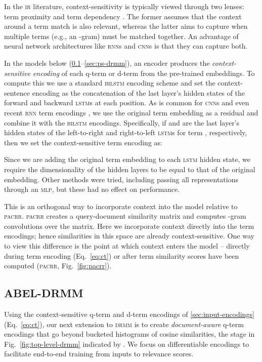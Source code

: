 \documentclass[11pt,a4paper]{article}
\newcommand{\mlp}{\textsc{mlp}\xspace}
\newcommand{\lstm}{\textsc{lstm}\xspace}
\newcommand{\bilstm}{\textsc{bilstm}\xspace}
\newcommand{\rnn}{\textsc{rnn}\xspace}
\newcommand{\cnn}{\textsc{cnn}\xspace}
\newcommand{\ir}{\textsc{ir}\xspace}
\newcommand{\drmm}{\textsc{drmm}\xspace}
\newcommand{\pacrr}{\textsc{pacrr}\xspace}
\begin{document}
In the \ir literature, context-sensitivity is typically viewed through two lenses: term proximity \cite{buttcher2006term} and term dependency \cite{metzler2005markov}. The former assumes that
the context around a term match is also relevant, whereas the latter aims to capture when multiple terms (e.g., an -gram) must be 
matched together. An advantage of neural network architectures like \rnn{s} and \cnn{s} is that they can capture both.

In the models below (\ref{sec:had-drmm}--\ref{sec:ps-drmm}), an encoder produces the \emph{context-sensitive encoding} of each q-term or d-term from the pre-trained embeddings. To compute this we use a standard \bilstm encoding scheme and set the context-sentence encoding as the concatenation of the last layer's hidden states of the forward and backward \lstm{s} at each position. As is common for \cnn{s} and even recent \rnn term encodings \cite{peters2018deep}, we use the original term embedding  as a residual and combine it with the \bilstm encodings. Specifically, if  and  are the last layer's hidden states of the left-to-right and right-to-left \lstm{s} for term , respectively, then we set the context-sensitive term encoding as:

Since we are adding the original term embedding to each \lstm hidden state, we require the dimensionality of the hidden layers to be equal to that of the original embedding. Other methods were tried, including passing all representations through an \mlp, but these had no effect on performance.

This is an orthogonal way to incorporate context into the model relative to \pacrr. 
\pacrr creates a query-document similarity matrix and computes -gram  convolutions over the matrix. Here we incorporate context directly into the term 
encodings; hence similarities in this space are already context-sensitive. One way to view this difference is the point at which context enters the model -- 
directly during term encoding (Eq.~\ref{eq:ct}) or after term similarity scores have been computed (\pacrr, Fig.~\ref{fig:pacrr}).



\subsection{ABEL-DRMM}
\label{sec:had-drmm}
\label{sec:abel-drmm}

Using the context-sensitive q-term and d-term encodings of \ref{sec:input-encodings} (Eq.~\ref{eq:ct}), our next extension to \drmm is to create \emph{document-aware} q-term encodings that go beyond bucketed histograms of cosine similarities, the stage in Fig.~\ref{fig:top-level-drmm} indicated by . We focus on differentiable encodings to facilitate end-to-end training from inputs to relevance scores.
\end{document}
